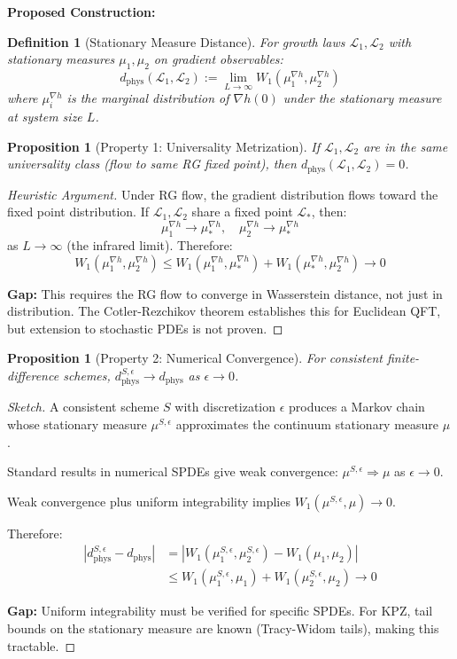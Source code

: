 \documentclass[11pt]{article}
\newtheorem{definition}{Definition}[section]
\newtheorem{proposition}[theorem]{Proposition}
\begin{document}
\textbf{Proposed Construction:}

\begin{definition}[Stationary Measure Distance]
For growth laws $\mathcal{L}_1, \mathcal{L}_2$ with stationary measures $\mu_1, \mu_2$ on gradient observables:
\[
d_{\text{phys}}(\mathcal{L}_1, \mathcal{L}_2) := \lim_{L \to \infty} W_1(\mu_1^{\nabla h}, \mu_2^{\nabla h})
\]
where $\mu_i^{\nabla h}$ is the marginal distribution of $\nabla h(0)$ under the stationary measure at system size $L$.
\end{definition}

\begin{proposition}[Property 1: Universality Metrization]
If $\mathcal{L}_1, \mathcal{L}_2$ are in the same universality class (flow to same RG fixed point), then $d_{\text{phys}}(\mathcal{L}_1, \mathcal{L}_2) = 0$.
\end{proposition}

\begin{proof}[Heuristic Argument]
Under RG flow, the gradient distribution flows toward the fixed point distribution. If $\mathcal{L}_1, \mathcal{L}_2$ share a fixed point $\mathcal{L}_*$, then:
\[
\mu_1^{\nabla h} \to \mu_*^{\nabla h}, \quad \mu_2^{\nabla h} \to \mu_*^{\nabla h}
\]
as $L \to \infty$ (the infrared limit). Therefore:
\[
W_1(\mu_1^{\nabla h}, \mu_2^{\nabla h}) \leq W_1(\mu_1^{\nabla h}, \mu_*^{\nabla h}) + W_1(\mu_*^{\nabla h}, \mu_2^{\nabla h}) \to 0
\]

\textbf{Gap:} This requires the RG flow to converge in Wasserstein distance, not just in distribution. The Cotler-Rezchikov theorem establishes this for Euclidean QFT, but extension to stochastic PDEs is not proven.
\end{proof}

\begin{proposition}[Property 2: Numerical Convergence]
For consistent finite-difference schemes, $d_{\text{phys}}^{S,\epsilon} \to d_{\text{phys}}$ as $\epsilon \to 0$.
\end{proposition}

\begin{proof}[Sketch]
A consistent scheme $S$ with discretization $\epsilon$ produces a Markov chain whose stationary measure $\mu^{S,\epsilon}$ approximates the continuum stationary measure $\mu$. 

Standard results in numerical SPDEs give weak convergence: $\mu^{S,\epsilon} \Rightarrow \mu$ as $\epsilon \to 0$.

Weak convergence plus uniform integrability implies $W_1(\mu^{S,\epsilon}, \mu) \to 0$.

Therefore:
\begin{align}
|d_{\text{phys}}^{S,\epsilon} - d_{\text{phys}}| &= |W_1(\mu_1^{S,\epsilon}, \mu_2^{S,\epsilon}) - W_1(\mu_1, \mu_2)| \\
&\leq W_1(\mu_1^{S,\epsilon}, \mu_1) + W_1(\mu_2^{S,\epsilon}, \mu_2) \to 0
\end{align}

\textbf{Gap:} Uniform integrability must be verified for specific SPDEs. For KPZ, tail bounds on the stationary measure are known (Tracy-Widom tails), making this tractable.
\end{proof}
\end{document}
